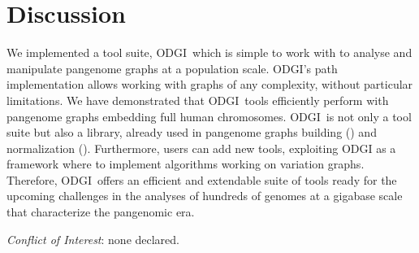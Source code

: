 \documentclass{bioinfo}
\newcommand{\odgi}{ODGI}
\begin{document}
    \section{Discussion}
    We implemented a tool suite, \odgi\, which is simple to work with to analyse and manipulate pangenome graphs at a
    population scale. ODGI's path implementation allows working with graphs of any complexity, without particular
    limitations. We have demonstrated that \odgi\ tools efficiently perform with pangenome graphs embedding full human
    chromosomes. \odgi\ is not only a tool suite but also a library, already used in pangenome graphs building
    (\citep{pggb}) and normalization (\citep{smoothxg}). Furthermore, users can add new tools, exploiting ODGI as a
    framework where to implement algorithms working on variation graphs. Therefore, \odgi\ offers an efficient and
    extendable suite of tools ready for the upcoming challenges in the analyses of hundreds of genomes at a gigabase
    scale that characterize the pangenomic era.


%
%


    \textit{Conflict of Interest}: none declared.
    \vspace*{+12pt}



\end{document}

